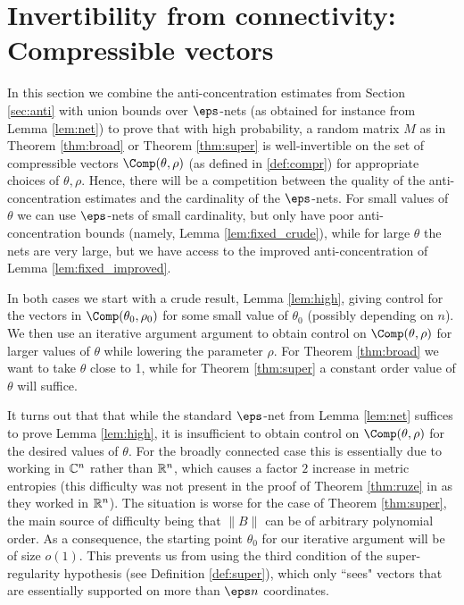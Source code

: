 \documentclass[aop,preprint]{imsart}
\theoremstyle{plain}
\theoremstyle{definition}
\theoremstyle{remark}
\numberwithin{equation}{section}
\numberwithin{theorem}{section}
\begin{document}
\section{Invertibility from connectivity: Compressible vectors}	\label{sec:comp}

In this section we combine the anti-concentration estimates from Section \ref{sec:anti} with union bounds over $\eps$-nets (as obtained for instance from Lemma \ref{lem:net}) to prove that with high probability, a random matrix $M$ as in Theorem \ref{thm:broad} or Theorem \ref{thm:super} is well-invertible on the set of compressible vectors $\Comp(\theta,\rho)$ (as defined in \eqref{def:compr}) for appropriate choices of $\theta,\rho$.
Hence, there will be a competition between the quality of the anti-concentration estimates and the cardinality of the $\eps$-nets.
For small values of $\theta$ we can use $\eps$-nets of small cardinality, but only have poor anti-concentration bounds (namely, Lemma \ref{lem:fixed_crude}), while for large $\theta$ the nets are very large, but we have access to the improved anti-concentration of Lemma \ref{lem:fixed_improved}.

In both cases we start with a crude result, Lemma \ref{lem:high}, giving control for the vectors in $\Comp(\theta_0,\rho_0)$ for some small value of $\theta_0$ (possibly depending on $n$).
We then use an iterative argument argument to obtain control on $\Comp(\theta,\rho)$ for larger values of $\theta$ while lowering the parameter $\rho$.
For Theorem \ref{thm:broad} we want to take $\theta$ close to 1, while for Theorem \ref{thm:super} a constant order value of $\theta$ will suffice.

It turns out that that while the standard $\eps$-net from Lemma \ref{lem:net} suffices to prove Lemma \ref{lem:high}, it is insufficient to obtain control on $\Comp(\theta,\rho)$ for the desired values of $\theta$.
For the broadly connected case this is essentially due to working in ${\mathbb C}^n$ rather than ${\mathbb R}^n$, which causes a factor $2$ increase in metric entropies (this difficulty was not present in the proof of Theorem \ref{thm:ruze} in \citep{RuZe} as they worked in ${\mathbb R}^n$).
The situation is worse for the case of Theorem \ref{thm:super}, the main source of difficulty being that $\|B\|$ can be of arbitrary polynomial order. As a consequence, the starting point $\theta_0$ for our iterative argument will be of size $o(1)$.
This prevents us from using the third condition of the super-regularity hypothesis (see Definition \ref{def:super}), which only ``sees" vectors that are essentially supported on more than $\eps n$ coordinates.
\end{document}
